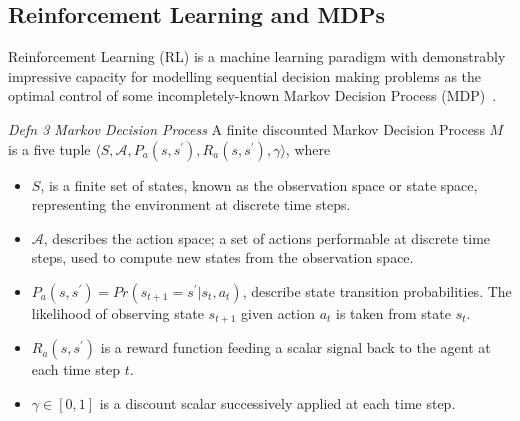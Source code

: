 \documentclass[conference,compsoc]{IEEEtran}
\begin{document}

\subsection{Reinforcement Learning and MDPs}
Reinforcement Learning (RL) is a machine learning paradigm with demonstrably impressive capacity for modelling sequential decision making problems as the optimal control of some incompletely-known Markov Decision Process (MDP)~\cite{sutton2018reinforcement}.



\textit{Defn 3 Markov Decision Process} A finite discounted Markov Decision Process $M$ is a five tuple $\langle S,\mathcal{A},P_a(s,s^\prime), R_a(s,s^\prime),\gamma \rangle$, where 
\begin{itemize}
	\item $S$, is a finite set of states, known as the observation space or state space, representing the environment at discrete time steps.
	\item $\mathcal{A}$, describes the action space; a set of actions performable at discrete time steps, used to compute new states from the observation space.
	\item $P_a(s,s^\prime) = Pr(s_{t+1} = s^\prime | s_t, a_t)$, describe state transition probabilities. The likelihood of observing state $s_{t+1}$ given action $a_t$ is taken from state $s_t$.
	\item $R_a(s,s^\prime)$ is a reward function feeding a scalar signal back to the agent at each time step $t$. 
	\item $\gamma \in [0,1]$ is a discount scalar successively applied at each time step.
\end{itemize}

\end{document}
